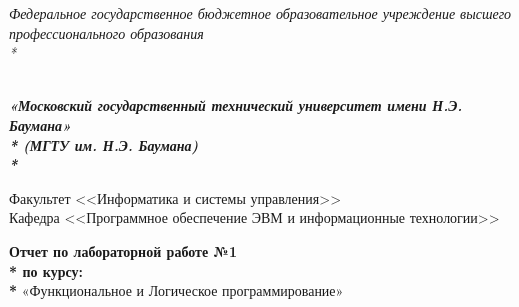 \newpage
\begin{titlepage}
\thispagestyle{empty}

{\large
\begin{center}
	\textsl{Федеральное государственное бюджетное образовательное учреждение высшего профессионального образования \\* }	
	\vspace{2em}
\end{center}
}
{
\begin{minipage}[t]{0.13\textwidth}
  \centering{}
  \label{fig0}
  \end{minipage}\hfill
\begin{minipage}[t]{0.65\textwidth}
\begin{center}
\large  \textsl{\textbf {\\ «Московский государственный технический университет имени Н.Э. Баумана» \\* (МГТУ им. Н.Э. Баумана) \\* }}
  \end{center}
\end{minipage}
}

\vspace{2em}

\hrulefill

\begin{center}
 	\vspace{0pt plus2fill} %
	{\large
	Факультет  <<Информатика и системы управления>>\\
	Кафедра  <<Программное обеспечение ЭВМ и информационные технологии>>
	}
\end{center}

{\Large
\begin{center}
	\textbf{Отчет по лабораторной работе №1 \\* по курсу: \\* } «Функциональное и Логическое программирование» \\
\end{center}
}
%
\vspace{0pt plus4fill} %


\end{titlepage}
